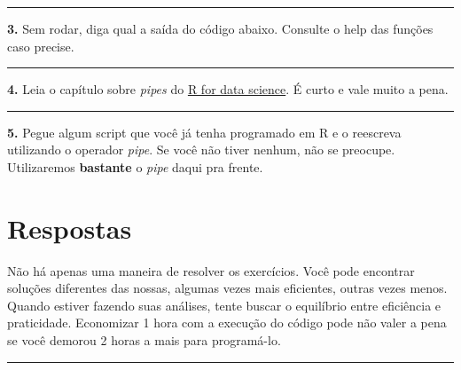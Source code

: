 \documentclass[]{book}
\newenvironment{Shaded}{\begin{snugshade}}{\end{snugshade}}
\newcommand{\DataTypeTok}[1]{\textcolor[rgb]{0.13,0.29,0.53}{#1}}
\newcommand{\DecValTok}[1]{\textcolor[rgb]{0.00,0.00,0.81}{#1}}
\newcommand{\KeywordTok}[1]{\textcolor[rgb]{0.13,0.29,0.53}{\textbf{#1}}}
\newcommand{\NormalTok}[1]{#1}
\newcommand{\OperatorTok}[1]{\textcolor[rgb]{0.81,0.36,0.00}{\textbf{#1}}}
\newcommand{\OtherTok}[1]{\textcolor[rgb]{0.56,0.35,0.01}{#1}}
\newcommand{\StringTok}[1]{\textcolor[rgb]{0.31,0.60,0.02}{#1}}
\begin{document}
\begin{center}\rule{0.5\linewidth}{\linethickness}\end{center}

\textbf{3.} Sem rodar, diga qual a saída do código abaixo. Consulte o help das funções caso precise.

\begin{Shaded}
\end{Shaded}

\begin{center}\rule{0.5\linewidth}{\linethickness}\end{center}

\textbf{4.} Leia o capítulo sobre \emph{pipes} do \href{http://r4ds.had.co.nz/pipes.html}{R for data science}. É curto e vale muito a pena.

\begin{center}\rule{0.5\linewidth}{\linethickness}\end{center}

\textbf{5.} Pegue algum script que você já tenha programado em R e o reescreva utilizando o operador \emph{pipe}. Se você não tiver nenhum, não se preocupe. Utilizaremos \textbf{bastante} o \emph{pipe} daqui pra frente.

\hypertarget{respostas-1}{%
\section{Respostas}\label{respostas-1}}

Não há apenas uma maneira de resolver os exercícios. Você pode encontrar soluções diferentes das nossas, algumas vezes mais eficientes, outras vezes menos. Quando estiver fazendo suas análises, tente buscar o equilíbrio entre eficiência e praticidade. Economizar 1 hora com a execução do código pode não valer a pena se você demorou 2 horas a mais para programá-lo.

\begin{center}\rule{0.5\linewidth}{\linethickness}\end{center}
\end{document}
